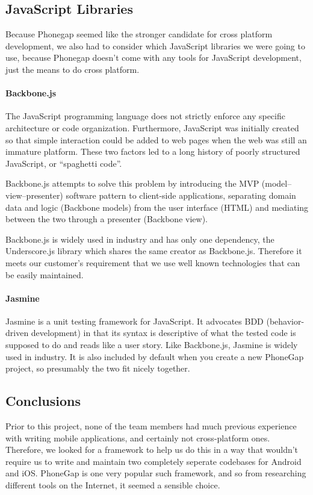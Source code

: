 \subsection{JavaScript Libraries}

Because Phonegap seemed like the stronger candidate for cross platform development, 
we also had to consider which JavaScript libraries we were going to use, because
Phonegap doesn't come with any tools for JavaScript development, just the means 
to do cross platform.

\paragraph{Backbone.js}
The JavaScript programming language does not strictly enforce any specific
architecture or code organization. Furthermore, JavaScript was initially
created so that simple interaction could be added to web pages when the web was
still an immature platform. These two factors led to a long history of poorly
structured JavaScript, or ``spaghetti code''.

Backbone.js attempts to solve this problem by introducing the MVP
(model--view--presenter) software pattern to client-side applications,
separating domain data and logic (Backbone models) from the user interface
(HTML) and mediating between the two through a presenter (Backbone view).

Backbone.js is widely used in industry and has only one dependency, the
Underscore.js library which shares the same creator as Backbone.js.
Therefore it meets our customer's requirement that we use well known
technologies that can be easily maintained. \cite{backbone}

\paragraph{Jasmine}
Jasmine is a unit testing framework for JavaScript. It advocates BDD
(behavior-driven development) in that its syntax is descriptive of what the
tested code is supposed to do and reads like a user story. Like Backbone.js,
Jasmine is widely used in industry. It is also included by default when you
create a new PhoneGap project, so presumably the two fit nicely together.
\cite{jasmine}

\subsection{Conclusions}
Prior to this project, none of the team members had much previous experience
with writing mobile applications, and certainly not cross-platform ones.
Therefore, we looked for a framework to help us do this in a way that wouldn't
require us to write and maintain two completely seperate codebases for Android
and iOS. PhoneGap is one very popular such framework, and so from researching
different tools on the Internet, it seemed a sensible choice.

